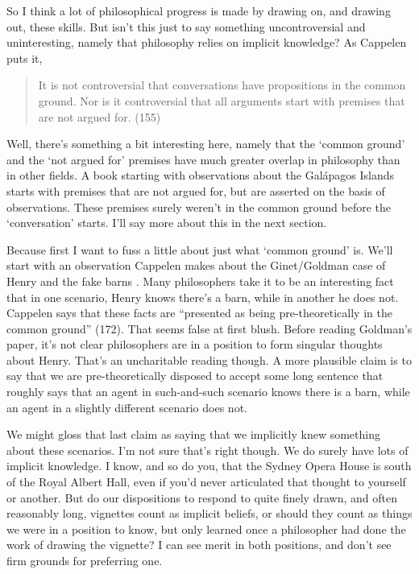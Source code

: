 So I think a lot of philosophical progress is made by drawing on, and drawing out, these skills. But isn't this just to say something uncontroversial and uninteresting, namely that philosophy relies on implicit knowledge? As Cappelen puts it,

\begin{quote}
It is not controversial that conversations have propositions in the common ground. Nor is it controversial that all arguments start with premises that are not argued for. (155)
\end{quote}

\noindent Well, there's something a bit interesting here, namely that the `common ground' and the `not argued for' premises have much greater overlap in philosophy than in other fields. A book starting with observations about the Gal\'apagos Islands starts with premises that are not argued for, but are asserted on the basis of observations. These premises surely weren't in the common ground before the `conversation' starts. I'll say more about this in the next section.

Because first I want to fuss a little about just what `common ground' is. We'll start with an observation Cappelen makes about the Ginet/Goldman case of Henry and the fake barns \citep{Goldman1976}. Many philosophers take it to be an interesting fact that in one scenario, Henry knows there's a barn, while in another he does not. Cappelen says that these facts are ``presented as being pre-theoretically in the common ground'' (172). That seems  false at first blush. Before reading Goldman's paper, it's not clear philosophers are in a position to form singular thoughts about Henry. That's an uncharitable reading though. A more plausible claim is to say that we are pre-theoretically disposed to accept some long sentence that roughly says that an agent in such-and-such scenario knows there is a barn, while an agent in a slightly different scenario does not.

We might gloss that last claim as saying that we implicitly knew something about these scenarios. I'm not sure that's right though. We do surely have lots of implicit knowledge. I know, and so do you, that the Sydney Opera House is south of the Royal Albert Hall, even if you'd never articulated that thought to yourself or another. But do our dispositions to respond to quite finely drawn, and often reasonably long, vignettes count as implicit beliefs, or should they count as things we were in a position to know, but only learned once a philosopher had done the work of drawing the vignette? I can see merit in both positions, and don't see firm grounds for preferring one. 


